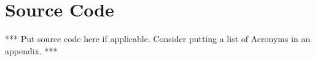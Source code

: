 \chapter{Source Code}
\label{ch:code}
*** Put source code here if applicable. Consider putting a list of Acronyms in an appendix. ***